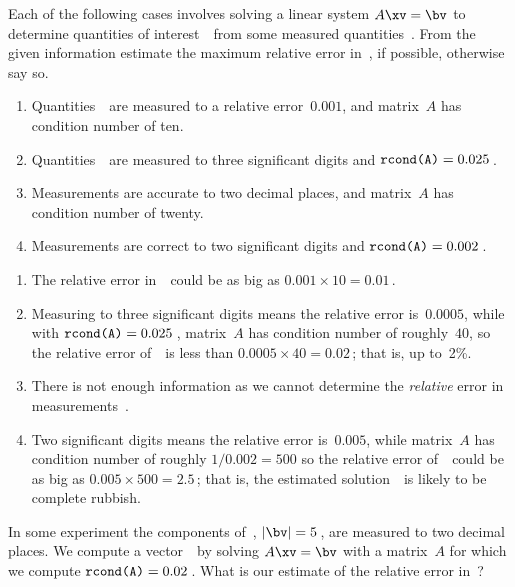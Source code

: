 \begin{example} \label{eg:}
Each of the following cases involves solving a linear system \(A\xv=\bv\) to determine quantities of interest~\xv\ from some measured quantities~\bv.
From the given information estimate the maximum relative error in~\xv,  if  possible, otherwise say so.
\begin{enumerate}
\item Quantities~\bv\ are measured to a relative error~\(0.001\), and matrix~\(A\) has condition number of ten.
\item Quantities~\bv\ are measured to three significant digits and \(\verb|rcond(A)|=0.025\)\,.
\item Measurements are accurate to two decimal places, and matrix~\(A\) has condition number of twenty.
\item  Measurements are correct to two significant digits and \(\verb|rcond(A)|=0.002\)\,.
\end{enumerate}

\begin{solution} 
\begin{enumerate}
\item The relative error in~\xv\ could be as big as \(0.001\times10=0.01\)\,.
\item Measuring to three significant digits means the relative error is~\(0.0005\), while with \(\verb|rcond(A)|=0.025\)\,, matrix~\(A\) has condition number of roughly~\(40\), so the relative error of~\xv\ is less than \(0.0005\times40=0.02\)\,; that is, up to~2\%.
\item There is not enough information as we cannot determine the \emph{relative} error in measurements~\bv.
\item Two significant digits means the relative error is~\(0.005\), while matrix~\(A\) has condition number of roughly \(1/0.002=500\) so the relative error of~\xv\ could be as big as \(0.005\times500=2.5\)\,; that is, the estimated solution~\xv\ is likely to be complete rubbish.
\end{enumerate}
\end{solution}
\end{example}




\begin{activity}
In some experiment the components of~\bv, \(|\bv|=5\)\,, are measured to two decimal places.
We compute a vector~\xv\ by solving \(A\xv=\bv\) with a matrix~\(A\) for which we compute \(\verb|rcond(A)|=0.02\)\,.
What is our estimate of the relative error in~\xv?
\end{activity}




